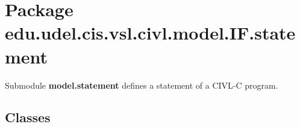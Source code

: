 \hypertarget{namespaceedu_1_1udel_1_1cis_1_1vsl_1_1civl_1_1model_1_1IF_1_1statement}{}\section{Package edu.\+udel.\+cis.\+vsl.\+civl.\+model.\+I\+F.\+statement}
\label{namespaceedu_1_1udel_1_1cis_1_1vsl_1_1civl_1_1model_1_1IF_1_1statement}


Submodule {\bfseries model.\+statement} defines a statement of a C\+I\+V\+L-\/\+C program.  


\subsection*{Classes}
